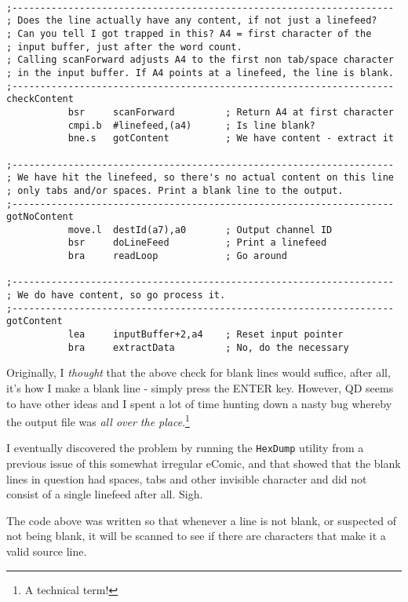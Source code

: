 \begin{lstlisting}[firstnumber=last,caption={ASMReformat Source - Checking for Content}]

;--------------------------------------------------------------------
; Does the line actually have any content, if not just a linefeed?
; Can you tell I got trapped in this? A4 = first character of the 
; input buffer, just after the word count.
; Calling scanForward adjusts A4 to the first non tab/space character
; in the input buffer. If A4 points at a linefeed, the line is blank.
;--------------------------------------------------------------------
checkContent
           bsr     scanForward         ; Return A4 at first character
           cmpi.b  #linefeed,(a4)      ; Is line blank?
           bne.s   gotContent          ; We have content - extract it

;--------------------------------------------------------------------
; We have hit the linefeed, so there's no actual content on this line
; only tabs and/or spaces. Print a blank line to the output.
;--------------------------------------------------------------------
gotNoContent
           move.l  destId(a7),a0       ; Output channel ID
           bsr     doLineFeed          ; Print a linefeed
           bra     readLoop            ; Go around

;--------------------------------------------------------------------
; We do have content, so go process it.
;--------------------------------------------------------------------
gotContent
           lea     inputBuffer+2,a4    ; Reset input pointer
           bra     extractData         ; No, do the necessary
\end{lstlisting}

Originally, I \emph{thought} that the above check for blank lines would suffice, after all, it's how I make a blank line - simply press the ENTER key. However, QD seems to have other ideas and I spent a lot of time hunting down a nasty bug whereby the output file was \emph{all over the place}.\footnote{A technical term!}

I eventually discovered the problem by running the \texttt{HexDump} utility from a previous issue of this somewhat irregular eComic, and that showed that the blank lines in question had spaces, tabs and other invisible character and did not consist of a single linefeed after all. Sigh.

The code above was written so that whenever a line is not blank, or suspected of not being blank, it will be scanned to see if there are characters that make it a valid source line.

